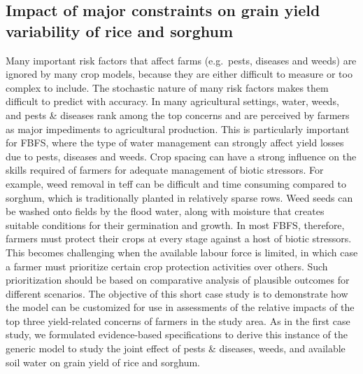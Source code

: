 \documentclass[]{elsarticle} %
\begin{document}
\hypertarget{refs53}{%
\subsection{Impact of major constraints on grain yield variability of rice and sorghum}\label{refs53}}

Many important risk factors that affect farms (e.g.~pests, diseases and weeds) are ignored by many crop models, because they are either difficult to measure or too complex to include. The stochastic nature of many risk factors makes them difficult to predict with accuracy. In many agricultural settings, water, weeds, and pests \& diseases rank among the top concerns and are perceived by farmers as major impediments to agricultural production. This is particularly important for FBFS, where the type of water management can strongly affect yield losses due to pests, diseases and weeds. Crop spacing can have a strong influence on the skills required of farmers for adequate management of biotic stressors. For example, weed removal in teff can be difficult and time consuming compared to sorghum, which is traditionally planted in relatively sparse rows. Weed seeds can be washed onto fields by the flood water, along with moisture that creates suitable conditions for their germination and growth. In most FBFS, therefore, farmers must protect their crops at every stage against a host of biotic stressors. This becomes challenging when the available labour force is limited, in which case a farmer must prioritize certain crop protection activities over others. Such prioritization should be based on comparative analysis of plausible outcomes for different scenarios. The objective of this short case study is to demonstrate how the model can be customized for use in assessments of the relative impacts of the top three yield-related concerns of farmers in the study area. As in the first case study, we formulated evidence-based specifications to derive this instance of the generic model to study the joint effect of pests \& diseases, weeds, and available soil water on grain yield of rice and sorghum.
\end{document}

